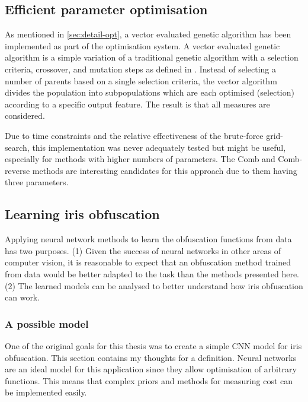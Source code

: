 \subsection{Efficient parameter optimisation}\label{sec:future-optim}
As mentioned in \cref{sec:detail-opt}, a vector evaluated genetic algorithm has been implemented as part of the optimisation system. A vector evaluated genetic algorithm is a simple variation of a traditional genetic algorithm with a selection criteria, crossover, and mutation steps as defined in \parencite[148, 222]{kochenderfer2019algorithms}. Instead of selecting a number of parents based on a single selection criteria, the vector algorithm divides the population into subpopulations which are each optimised (selection) according to a specific output feature. The result is that all measures are considered. 

Due to time constraints and the relative effectiveness of the brute-force grid-search, this implementation was never adequately tested but might be useful, especially for methods with higher numbers of parameters. The Comb and Comb-reverse methods are interesting candidates for this approach due to them having three parameters.

\subsection{Learning iris obfuscation}
Applying neural network methods to learn the obfuscation functions from data has two purposes. (1) Given the success of neural networks in other areas of computer vision, it is reasonable to expect that an obfuscation method trained from data would be better adapted to the task than the methods presented here. (2) The learned models can be analysed to better understand how iris obfuscation can work.

\subsubsection{A possible model}
One of the original goals for this thesis was to create a simple CNN model for iris obfuscation. This section contains my thoughts for a definition. Neural networks are an ideal model for this application since they allow optimisation of arbitrary functions. This means that complex priors and methods for measuring cost can be implemented easily. 

